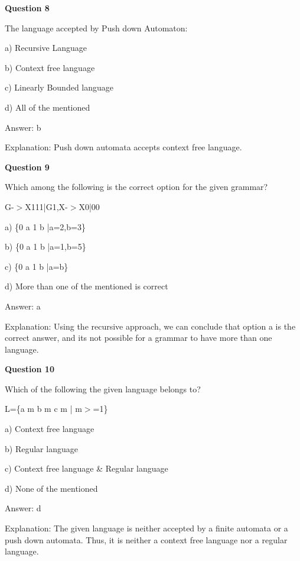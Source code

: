 \documentclass{article}
\begin{document}
\begin{mdframed}[linewidth=1pt, roundcorner=5pt, linecolor=gray!30, backgroundcolor=gray!5]
\textbf{Question 8} 

The language accepted by Push down Automaton:

a) Recursive Language

b) Context free language

c) Linearly Bounded language

d) All of the mentioned
\vspace{5pt} \par
\begin{tcolorbox}[colback=green!5, colframe=green!40!black, title=Solution]
Answer: b

Explanation: Push down automata accepts context free language.
\end{tcolorbox}
\end{mdframed}

\begin{mdframed}[linewidth=1pt, roundcorner=5pt, linecolor=gray!30, backgroundcolor=gray!5]
\textbf{Question 9} 

Which among the following is the correct option for the given grammar?

G-$>$X111|G1,X-$>$X0|00

a) \{0
a
1
b
|a=2,b=3\}

b) \{0
a
1
b
|a=1,b=5\}

c) \{0
a
1
b
|a=b\}

d) More than one of the mentioned is correct
\vspace{5pt} \par
\begin{tcolorbox}[colback=green!5, colframe=green!40!black, title=Solution]
Answer: a

Explanation: Using the recursive approach, we can conclude that option a is the correct answer, and its not possible for a grammar to have more than one language.
\end{tcolorbox}
\end{mdframed}
\newpage

\begin{mdframed}[linewidth=1pt, roundcorner=5pt, linecolor=gray!30, backgroundcolor=gray!5]
\textbf{Question 10} 

Which of the following the given language belongs to?

L=\{a
m
b
m
c
m
| m$>$=1\}

a) Context free language

b) Regular language

c) Context free language \& Regular language

d) None of the mentioned
\vspace{5pt} \par
\begin{tcolorbox}[colback=green!5, colframe=green!40!black, title=Solution]
Answer: d

Explanation: The given language is neither accepted by a finite automata or a push down automata. Thus, it is neither a context free language nor a regular language.
\end{tcolorbox}
\end{mdframed}
\end{document}
